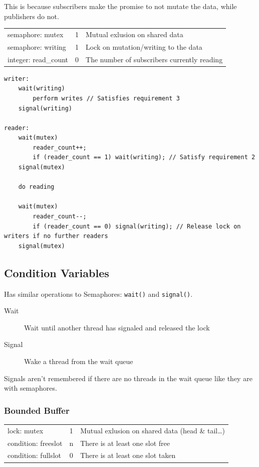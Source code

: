 \documentclass{article}
\begin{document}
This is because subscribers make the promise to not mutate the data,
while publishers do not.

\begin{tabular}{l | c | l }
semaphore: mutex     & 1 & Mutual exlusion on shared data\\
semaphore: writing   & 1 & Lock on mutation/writing to the data\\
integer: read\_count & 0 & The number of subscribers currently reading
\end{tabular}

\begin{verbatim}
writer:
    wait(writing)
        perform writes // Satisfies requirement 3
    signal(writing)
    
reader:
    wait(mutex)
        reader_count++;
        if (reader_count == 1) wait(writing); // Satisfy requirement 2
    signal(mutex)
    
    do reading
    
    wait(mutex)
        reader_count--;
        if (reader_count == 0) signal(writing); // Release lock on writers if no further readers
    signal(mutex)
\end{verbatim}

\subsection{Condition Variables}

Has similar operations to Semaphores: \texttt{wait()} and \texttt{signal()}.

\begin{description}
  \item[Wait] Wait until another thread has signaled and released the lock
  \item[Signal] Wake a thread from the wait queue
\end{description}

Signals aren't remembered if there are no threads in the wait queue like they are with semaphores.

\subsubsection{Bounded Buffer}


\begin{tabular}{l | c | l }
lock:      mutex    & 1 & Mutual exlusion on shared data (head \& tail\ldots{})\\
condition: freeslot & n & There is at least one slot free\\
condition: fullslot & 0 & There is at least one slot taken
\end{tabular}
\end{document}
